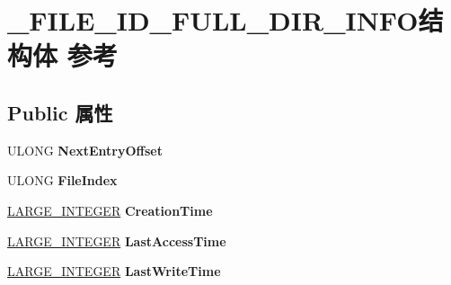 \hypertarget{struct___f_i_l_e___i_d___f_u_l_l___d_i_r___i_n_f_o}{}\section{\+\_\+\+F\+I\+L\+E\+\_\+\+I\+D\+\_\+\+F\+U\+L\+L\+\_\+\+D\+I\+R\+\_\+\+I\+N\+F\+O结构体 参考}
\label{struct___f_i_l_e___i_d___f_u_l_l___d_i_r___i_n_f_o}
\subsection*{Public 属性}
\begin{DoxyCompactItemize}
\item 
\mbox{\label{struct___f_i_l_e___i_d___f_u_l_l___d_i_r___i_n_f_o_a439e34a9d31261c98f16fd03c4a90cb5}} 
U\+L\+O\+NG {\bfseries Next\+Entry\+Offset}
\item 
\mbox{\label{struct___f_i_l_e___i_d___f_u_l_l___d_i_r___i_n_f_o_a2995c58de8f7c1ccd58d457c30f718bd}} 
U\+L\+O\+NG {\bfseries File\+Index}
\item 
\mbox{\label{struct___f_i_l_e___i_d___f_u_l_l___d_i_r___i_n_f_o_a84488370ba1bd787aa0343d4ebfd4e35}} 
\hyperlink{union___l_a_r_g_e___i_n_t_e_g_e_r}{L\+A\+R\+G\+E\+\_\+\+I\+N\+T\+E\+G\+ER} {\bfseries Creation\+Time}
\item 
\mbox{\label{struct___f_i_l_e___i_d___f_u_l_l___d_i_r___i_n_f_o_ad6d8927c7184a386ad4d928cc31c788d}} 
\hyperlink{union___l_a_r_g_e___i_n_t_e_g_e_r}{L\+A\+R\+G\+E\+\_\+\+I\+N\+T\+E\+G\+ER} {\bfseries Last\+Access\+Time}
\item 
\mbox{\label{struct___f_i_l_e___i_d___f_u_l_l___d_i_r___i_n_f_o_a75428684281fe53f8b085c15339d683d}} 
\hyperlink{union___l_a_r_g_e___i_n_t_e_g_e_r}{L\+A\+R\+G\+E\+\_\+\+I\+N\+T\+E\+G\+ER} {\bfseries Last\+Write\+Time}
\item 
\mbox{\label{struct___f_i_l_e___i_d___f_u_l_l___d_i_r___i_n_f_o_a09a7cf0627723dda86b39a2c11e47ea2}} 

\end{DoxyCompactItemize}
